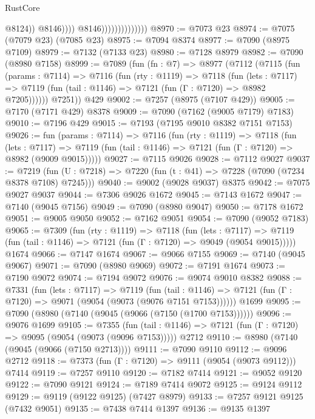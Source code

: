 \begin{lexlean}{RustCore}
\begin{coremodule}
                                            @8124))
                                        @8146))))
                                @8146))))))))))))))
@8970 := @7073 @23
@8974 := @7075 (@7079 @23) (@7085 @23)
@8975 := @7094 @8374
@8977 := @7090 (@8975 @7109)
@8979 := @7132 (@7133 @23)
@8980 := @7128 @8979
@8982 := @7090 (@8980 @7158)
@8999 := @7089
    (fun (fn : @7) =>
    @8977
      (@7112
        (@7115
          (fun (params : @7114) =>
          @7116
            (fun (rty : @1119) =>
            @7118
              (fun (lets : @7117) =>
              @7119 (fun (tail : @1146) => @7121 (fun (Γ : @7120) => @8982 @7205))))))
        @7251))
    @429
@9002 := @7257 (@8975 (@7107 @429))
@9005 := @7170 (@7171 @429) @8378
@9009 := @7090 (@7162 (@9005 @7179) @7183)
@9010 := @7196 @429
@9015 := @7193 (@7195 @9010 @8382 @7151 @7153)
@9026 := fun (params : @7114) =>
  @7116
    (fun (rty : @1119) =>
    @7118
      (fun (lets : @7117) =>
      @7119 (fun (tail : @1146) => @7121 (fun (Γ : @7120) => @8982 (@9009 @9015)))))
@9027 := @7115 @9026
@9028 := @7112 @9027
@9037 := @7219 (fun (U : @7218) => @7220 (fun (t : @41) => @7228 (@7090 (@7234 @8378 @7108) @7245)))
@9040 := @9002 (@9028 @9037) @8375
@9042 := @7075 @9027 @9037
@9044 := @7306 @9026 @1672
@9045 := @7143 @1672
@9047 := @7140 (@9045 @7156)
@9049 := @7090 (@8980 @9047)
@9050 := @7178 @1672
@9051 := @9005 @9050
@9052 := @7162 @9051
@9054 := @7090 (@9052 @7183)
@9065 := @7309
    (fun (rty : @1119) =>
    @7118
      (fun (lets : @7117) =>
      @7119 (fun (tail : @1146) => @7121 (fun (Γ : @7120) => @9049 (@9054 @9015)))))
    @1674
@9066 := @7147 @1674
@9067 := @9066 @7155
@9069 := @7140 (@9045 @9067)
@9071 := @7090 (@8980 @9069)
@9072 := @7191 @1674
@9073 := @7190 @9072
@9074 := @7194 @9072
@9076 := @9074 @9010 @8382
@9088 := @7331
    (fun (lets : @7117) =>
    @7119
      (fun (tail : @1146) => @7121 (fun (Γ : @7120) => @9071 (@9054 (@9073 (@9076 @7151 @7153))))))
    @1699
@9095 := @7090 (@8980 (@7140 (@9045 (@9066 (@7150 (@1700 @7153))))))
@9096 := @9076 @1699
@9105 := @7355
    (fun (tail : @1146) => @7121 (fun (Γ : @7120) => @9095 (@9054 (@9073 (@9096 @7153)))))
    @2712
@9110 := @8980 (@7140 (@9045 (@9066 (@7150 @2713))))
@9111 := @7090 @9110
@9112 := @9096 @2712
@9118 := @7373 (fun (Γ : @7120) => @9111 (@9054 (@9073 @9112))) @7414
@9119 := @7257 @9110
@9120 := @7182 @7414
@9121 := @9052 @9120
@9122 := @7090 @9121
@9124 := @7189 @7414 @9072
@9125 := @9124 @9112
@9129 := @9119 (@9122 @9125) (@7427 @8979)
@9133 := @7257 @9121 @9125 (@7432 @9051)
@9135 := @7438 @7414 @1397
@9136 := @9135 @1397

\end{coremodule}
\end{lexlean}
